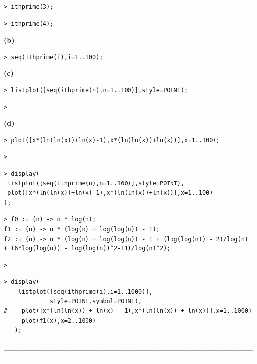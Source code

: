 \documentclass{article}
\begin{document}
\begin{lstlisting}
> ithprime(3);
\end{lstlisting}
\begin{lstlisting}
> ithprime(4);
\end{lstlisting}
\begin{Maple Normal}
\textbf{(b)}
\end{Maple Normal}
\begin{lstlisting}
> seq(ithprime(i),i=1..100);
\end{lstlisting}
\begin{Maple Normal}
\textbf{(c)}
\end{Maple Normal}
\begin{lstlisting}
> listplot([seq(ithprime(n),n=1..100)],style=POINT);
\end{lstlisting}
\begin{lstlisting}
> 
\end{lstlisting}
\begin{Maple Normal}
\textbf{(d)}
\end{Maple Normal}
\begin{lstlisting}
> plot([x*(ln(ln(x))+ln(x)-1),x*(ln(ln(x))+ln(x))],x=1..100);
\end{lstlisting}
\begin{lstlisting}
> 
\end{lstlisting}
\begin{lstlisting}
> display(
 listplot([seq(ithprime(n),n=1..100)],style=POINT),
 plot([x*(ln(ln(x))+ln(x)-1),x*(ln(ln(x))+ln(x))],x=1..100)
);

\end{lstlisting}
\begin{lstlisting}
> f0 := (n) -> n * log(n);
f1 := (n) -> n * (log(n) + log(log(n)) - 1);
f2 := (n) -> n * (log(n) + log(log(n)) - 1 + (log(log(n)) - 2)/log(n) + (6*log(log(n)) - log(log(n))^2-11)/log(n)^2);
\end{lstlisting}
\begin{lstlisting}
> 
\end{lstlisting}
\begin{lstlisting}
> display(
    listplot([seq(ithprime(i),i=1..1000)],
             style=POINT,symbol=POINT),
#    plot([x*(ln(ln(x)) + ln(x) - 1),x*(ln(ln(x)) + ln(x))],x=1..1000)
     plot(f1(x),x=2..1000)
   );
\end{lstlisting}
\begin{Maple Normal}
\_\_\_\_\_\_\_\_\_\_\_\_\_\_\_\_\_\_\_\_\_\_\_\_\_\_\_\_\_\_\_\_\_\_\_\_\_\_\_\_\_\_\_\_\_\_\_\_\_\_\_\_\_\_\_\_\_\_\_\_\_\_\_\_\_\_\_\_\_\_\_\_\_\_\_\_\_\_\_\_\_
\end{Maple Normal}
\end{document}

